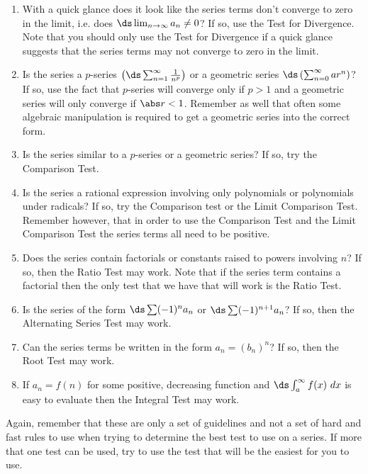 \begin{enumerate}
\item With a quick glance does it look like the series terms don't converge to zero in the limit, i.e. does $\ds \lim_{n\to \infty}a_n \neq 0$? If so, use the Test for Divergence. Note that you should only use the Test for Divergence if a quick glance suggests that the series terms may not converge to zero in the limit.

\item Is the series a $p$-series $\left(\ds \sum_{n=1}^\infty \frac{1}{n^p}\right)$ or a geometric series $\ds \left( \sum_{n=0}^\infty ar^n\right)$? If so, use the fact that $p$-series will converge only  if $p>1$ and a geometric series will only converge if $\abs r<1$. Remember as well that often some algebraic manipulation is required to get a geometric series into the correct form.

\item Is the series similar to a $p$-series or a geometric series? If so, try the Comparison Test.

\item Is the series a rational expression involving only polynomials or polynomials under radicals? If so, try the Comparison test or the Limit Comparison Test. Remember however, that in order to use the Comparison Test and the Limit Comparison Test the series terms all need to be positive.

\item Does the series contain factorials or constants raised to powers involving $n$? If so, then the Ratio Test may work. Note that if the series term contains a factorial then the only test that we have that will work is the Ratio Test.

\item Is the series of the form $\ds \sum (-1)^n a_n$ or $\ds\sum (-1)^{n+1} a_n$? If so, then the Alternating Series Test may work.

\item Can the series terms be written in the form $a_n=(b_n)^n$? If so, then the Root Test may work.

\item If $a_n=f(n)$ for some positive, decreasing function and $\ds \int_a^\infty f(x)\ dx$ is easy to evaluate then the Integral Test may work.
\end{enumerate}

Again, remember that these are only a set of guidelines and not a set of hard and fast rules to use when trying to determine the best test to use on a series. If more that one test can be used, try to use the test that will be the easiest for you to use.


